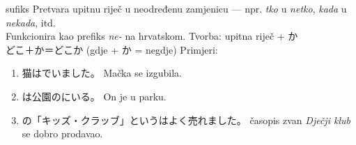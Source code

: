 \documentclass[10pt, utf8, border=0.4cm]{standalone}
\begin{document}
\pagecolor{navy}
\color{aqua}
\centering
\parbox{10cm}{
	 \hfill sufiks \br
		Pretvara upitnu riječ u neodređenu zamjenicu --- npr. \textit{tko} u \textit{netko}, \textit{kada} u \textit{nekada}, itd. \\
		Funkcionira kao prefiks \textit{ne-} na hrvatskom. \br
	Tvorba: upitna riječ + か \\
	どこ＋か＝どこか \hfill (gdje + か = negdje) \br
	Primjeri:
	\begin{enumerate}
		\item 猫はでいました。\bh
		Mačka se  izgubila.
		\item {}は公園のにいる。\bh
		On je  u parku.
		\item {}の「キッズ・クラッブ」というはよく売れました。\bh
		 časopis zvan \textit{Dječji klub} se dobro prodavao.
	\end{enumerate}
}
\end{document}
